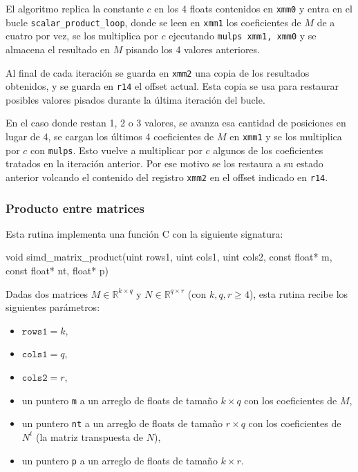 \documentclass[a4paper, 10pt, twoside]{article}
\newcommand{\cc}[1]{\texttt{#1}}
\begin{document}
El algoritmo replica la constante $c$ en los 4 floats contenidos en \cc{xmm0} y
entra en el bucle \cc{scalar\_product\_loop}, donde se leen en \cc{xmm1} los
coeficientes de $M$ de a cuatro por vez, se los multiplica por $c$ ejecutando
\cc{mulps xmm1, xmm0} y se almacena el resultado en $M$ pisando los 4 valores
anteriores.

Al final de cada iteración se guarda en \cc{xmm2} una copia de los resultados
obtenidos, y se guarda en \cc{r14} el offset actual. Esta copia se usa para
restaurar posibles valores pisados durante la última iteración del bucle.

En el caso donde restan 1, 2 o 3 valores, se avanza esa cantidad de posiciones
en lugar de 4, se cargan los últimos 4 coeficientes de $M$ en \cc{xmm1} y se
los multiplica por $c$ con \cc{mulps}. Esto vuelve a multiplicar por $c$
algunos de los coeficientes tratados en la iteración anterior. Por ese motivo
se los restaura a su estado anterior volcando el contenido del registro
\cc{xmm2} en el offset indicado en \cc{r14}.


\subsubsection{Producto entre matrices}

Esta rutina implementa una función C con la siguiente signatura:

\begin{code}
  void simd_matrix_product(uint rows1,
                           uint cols1,
                           uint cols2,
                           const float* m,
                           const float* nt,
                           float* p)
\end{code}

Dadas dos matrices $M \in \mathbb{R}^{k \times q}$ y $N \in \mathbb{R}^{q \times
r}$ (con $k, q, r \geq 4$), esta rutina recibe los siguientes parámetros:

\begin{itemize}
  \item $\cc{rows1} = k$,
  \item $\cc{cols1} = q$,
  \item $\cc{cols2} = r$,
  \item un puntero \cc{m} a un arreglo de floats de tamaño $k \times q$ con los
    coeficientes de $M$,
  \item un puntero \cc{nt} a un arreglo de floats de tamaño $r \times q$ con
    los coeficientes de $N^t$ (la matriz transpuesta de $N$),
  \item un puntero \cc{p} a un arreglo de floats de tamaño $k \times r$.
\end{itemize}
\end{document}
